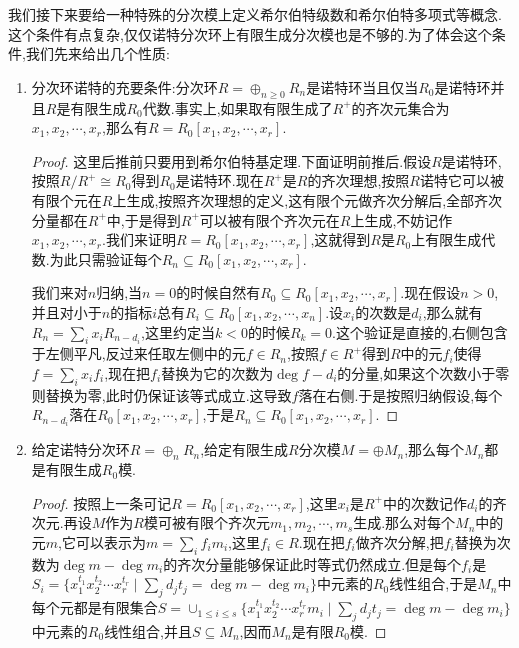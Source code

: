 我们接下来要给一种特殊的分次模上定义希尔伯特级数和希尔伯特多项式等概念.这个条件有点复杂,仅仅诺特分次环上有限生成分次模也是不够的.为了体会这个条件,我们先来给出几个性质:
\begin{enumerate}
	\item 分次环诺特的充要条件:分次环$R=\oplus_{n\ge0}R_n$是诺特环当且仅当$R_0$是诺特环并且$R$是有限生成$R_0$代数.事实上,如果取有限生成了$R^+$的齐次元集合为$x_1,x_2,\cdots,x_r$,那么有$R=R_0[x_1,x_2,\cdots,x_r]$.
	\begin{proof}
		
		这里后推前只要用到希尔伯特基定理.下面证明前推后.假设$R$是诺特环,按照$R/R^+\cong R_0$得到$R_0$是诺特环.现在$R^+$是$R$的齐次理想,按照$R$诺特它可以被有限个元在$R$上生成,按照齐次理想的定义,这有限个元做齐次分解后,全部齐次分量都在$R^+$中,于是得到$R^+$可以被有限个齐次元在$R$上生成,不妨记作$x_1,x_2,\cdots,x_r$.我们来证明$R=R_0[x_1,x_2,\cdots,x_r]$,这就得到$R$是$R_0$上有限生成代数.为此只需验证每个$R_n\subseteq R_0[x_1,x_2,\cdots,x_r]$.
		
		我们来对$n$归纳,当$n=0$的时候自然有$R_0\subseteq R_0[x_1,x_2,\cdots,x_r]$.现在假设$n>0$,并且对小于$n$的指标$i$总有$R_i\subseteq R_0[x_1,x_2,\cdots,x_n]$.设$x_i$的次数是$d_i$,那么就有$R_n=\sum_ix_iR_{n-d_i}$,这里约定当$k<0$的时候$R_k=0$.这个验证是直接的,右侧包含于左侧平凡,反过来任取左侧中的元$f\in R_n$,按照$f\in R^+$得到$R$中的元$f_i$使得$f=\sum_ix_if_i$,现在把$f_i$替换为它的次数为$\deg f-d_i$的分量,如果这个次数小于零则替换为零,此时仍保证该等式成立.这导致$f$落在右侧.于是按照归纳假设,每个$R_{n-d_i}$落在$R_0[x_1,x_2,\cdots,x_r]$,于是$R_n\subseteq R_0[x_1,x_2,\cdots,x_r]$.
	\end{proof}
	\item 给定诺特分次环$R=\oplus_nR_n$,给定有限生成$R$分次模$M=\oplus M_n$,那么每个$M_n$都是有限生成$R_0$模.
	\begin{proof}
		
		按照上一条可记$R=R_0[x_1,x_2,\cdots,x_r]$,这里$x_i$是$R^+$中的次数记作$d_i$的齐次元.再设$M$作为$R$模可被有限个齐次元$m_1,m_2,\cdots,m_s$生成.那么对每个$M_n$中的元$m$,它可以表示为$m=\sum_if_im_i$,这里$f_i\in R$.现在把$f_i$做齐次分解,把$f_i$替换为次数为$\deg m-\deg m_i$的齐次分量能够保证此时等式仍然成立.但是每个$f_i$是$S_i=\{x_1^{t_1}x_2^{t_2}\cdots x_r^{t_r}\mid \sum_jd_jt_j=\deg m-\deg m_i\}$中元素的$R_0$线性组合,于是$M_n$中每个元都是有限集合$S=\cup_{1\le i\le s}\{x_1^{t_1}x_2^{t_2}\cdots x_r^{t_r}m_i\mid\sum_jd_jt_j=\deg m-\deg m_i\}$中元素的$R_0$线性组合,并且$S\subseteq M_n$,因而$M_n$是有限$R_0$模.
	\end{proof}
\end{enumerate}

